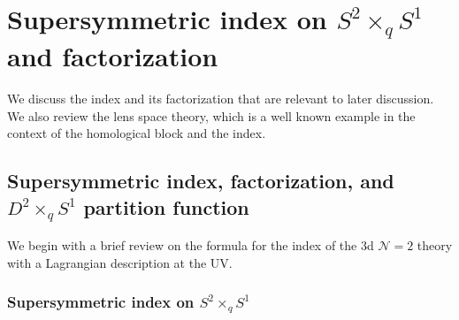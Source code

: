 \documentclass[11pt,hyper,a4paper]{article}
\begin{document}
\section{Supersymmetric index on $S^2 \times_q S^1$ and factorization}

We discuss the index and its factorization that are relevant to later discussion.
We also review the lens space theory, which is a well known example in the context of the homological block and the index.





\subsection{Supersymmetric index, factorization, and $D^2 \times_q S^1$ partition function}
\label{ssec:factorization}

We begin with a brief review on the formula for the index of the 3d $\mathcal{N}=2$ theory with a Lagrangian description at the UV.




\subsubsection*{Supersymmetric index on $S^2 \times_q S^1$}
\end{document}
